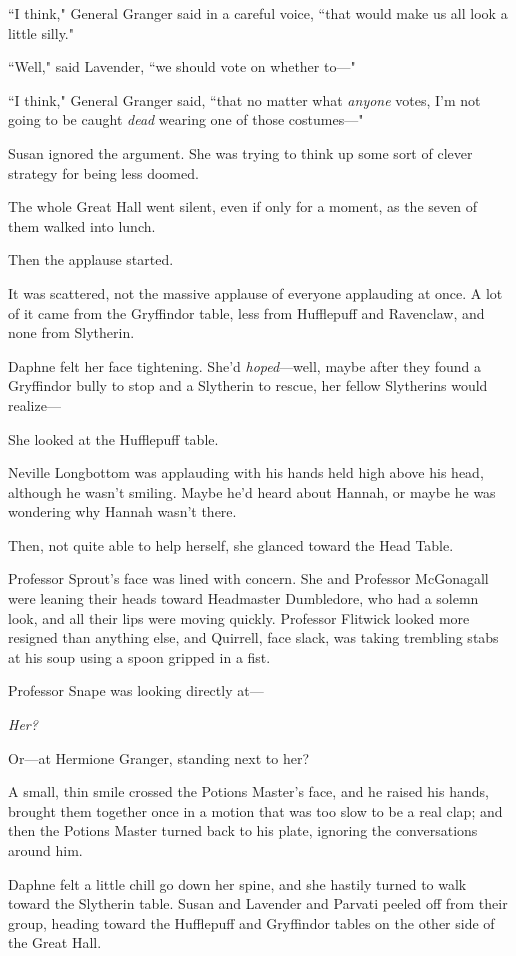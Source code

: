 ``I think," General Granger said in a careful voice, ``that would make us all look a little silly."

``Well," said Lavender, ``we should vote on whether to—"

``I think," General Granger said, ``that no matter what \emph{anyone} votes, I'm not going to be caught \emph{dead} wearing one of those costumes—"

Susan ignored the argument. She was trying to think up some sort of clever strategy for being less doomed.

\later

The whole Great Hall went silent, even if only for a moment, as the seven of them walked into lunch.

Then the applause started.

It was scattered, not the massive applause of everyone applauding at once. A lot of it came from the Gryffindor table, less from Hufflepuff and Ravenclaw, and none from Slytherin.

Daphne felt her face tightening. She'd \emph{hoped}—well, maybe after they found a Gryffindor bully to stop and a Slytherin to rescue, her fellow Slytherins would realize—

She looked at the Hufflepuff table.

Neville Longbottom was applauding with his hands held high above his head, although he wasn't smiling. Maybe he'd heard about Hannah, or maybe he was wondering why Hannah wasn't there.

Then, not quite able to help herself, she glanced toward the Head Table.

Professor Sprout's face was lined with concern. She and Professor McGonagall were leaning their heads toward Headmaster Dumbledore, who had a solemn look, and all their lips were moving quickly. Professor Flitwick looked more resigned than anything else, and Quirrell, face slack, was taking trembling stabs at his soup using a spoon gripped in a fist.

Professor Snape was looking directly at—

\emph{Her?}

Or—at Hermione Granger, standing next to her?

A small, thin smile crossed the Potions Master's face, and he raised his hands, brought them together once in a motion that was too slow to be a real clap; and then the Potions Master turned back to his plate, ignoring the conversations around him.

Daphne felt a little chill go down her spine, and she hastily turned to walk toward the Slytherin table. Susan and Lavender and Parvati peeled off from their group, heading toward the Hufflepuff and Gryffindor tables on the other side of the Great Hall.

